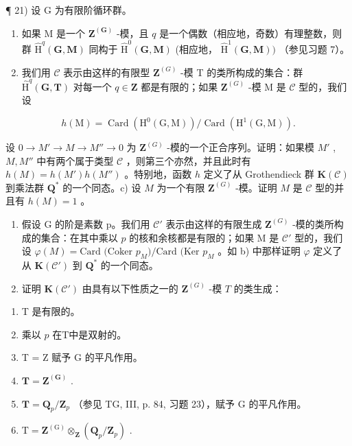 ¶ 21) 设 G 为有限阶循环群。

\begin{enumerate}
\def\labelenumi{\alph{enumi})}
\item
  如果 M 是一个 \(\mathbf{Z}^{(\mathbf{G})}\) -模，且 \(q\) 是一个偶数（相应地，奇数）有理整数，则群 \(\hat{\mathrm{H}}^q (\mathbf{G},\mathbf{M})\) 同构于 \(\hat{\mathrm{H}}^0 (\mathbf{G},\mathbf{M})\) (相应地， \(\hat{\mathrm{H}}^1 (\mathbf{G},\mathbf{M}))\) （参见习题 7）。
\item
  我们用 \(\mathcal{C}\) 表示由这样的有限型 \(\mathbf{Z}^{(G)}\) -模 T 的类所构成的集合：群 \(\hat{\mathrm{H}}^q (\mathbf{G},\mathbf{T})\) 对每一个 \(q\in \mathbf{Z}\) 都是有限的；如果 \(\mathbf{Z}^{(G)}\) -模 M 是 \(\mathcal{C}\) 型的，我们设
\end{enumerate}

\[
h (\mathrm{M}) = \operatorname{Card} \left(\mathrm{H} ^ {0} (\mathrm{G}, \mathrm{M})\right) / \operatorname{Card} \left(\mathrm{H} ^ {1} (\mathrm{G}, \mathrm{M})\right).
\]

设 \(0 \to M' \to M \to M'' \to 0\) 为 \(\mathbf{Z}^{(G)}\) -模的一个正合序列。证明：如果模 \(M'\) , \(M, M''\) 中有两个属于类型 \(\mathcal{C}\) ，则第三个亦然，并且此时有 \(h(M) = h(M') h(M'')\) 。特别地，函数 \(h\) 定义了从 Grothendieck 群 \(\mathbf{K}(\mathcal{C})\) 到乘法群 \(\mathbf{Q}^*\) 的一个同态。c) 设 \(M\) 为一个有限 \(\mathbf{Z}^{(G)}\) -模。证明 \(M\) 是 \(\mathcal{C}\) 型的并且有 \(h(M) = 1\) 。

\begin{enumerate}
\def\labelenumi{\alph{enumi})}
\setcounter{enumi}{3}
\item
  假设 G 的阶是素数 p。我们用 \(\mathcal{C}'\) 表示由这样的有限生成 \(\mathbf{Z}^{(G)}\) -模的类所构成的集合：在其中乘以 \(p\) 的核和余核都是有限的；如果 M 是 \(\mathcal{C}'\) 型的，我们设 \(\varphi(M) = \text{Card (Coker } p_M)/\text{Card (Ker } p_M\) 。如 b) 中那样证明 \(\varphi\) 定义了从 \(\mathbf{K}(\mathcal{C}')\) 到 \(\mathbf{Q}^*\) 的一个同态。
\item
  证明 \(\mathbf{K}(\mathcal{C}')\) 由具有以下性质之一的 \(\mathbf{Z}^{(G)}\) -模 \(T\) 的类生成：
\end{enumerate}

\begin{enumerate}
\def\labelenumi{(\roman{enumi})}
\item
  T 是有限的。
\item
  乘以 \(p\) 在T中是双射的。
\item
  T = Z 赋予 G 的平凡作用。
\item
  \(\mathbf{T} = \mathbf{Z}^{(\mathbf{G})}\) .
\item
  \(\mathbf{T} = \mathbf{Q}_p / \mathbf{Z}_p\) （参见 TG, III, p. 84, 习题 23），赋予 G 的平凡作用。
\item
  \(\mathrm{T} = \mathbf{Z}^{(\mathrm{G})}\otimes_{\mathbf{Z}}(\mathbf{Q}_p / \mathbf{Z}_p)\) .
\end{enumerate}

